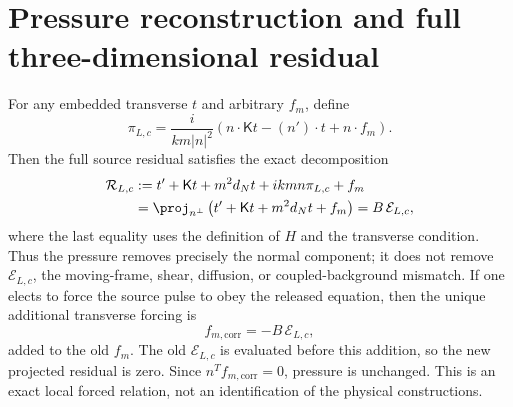 \section{Pressure reconstruction and full three-dimensional residual}
For any embedded transverse $t$ and arbitrary $f_m$, define
\begin{equation}
 \pi_{L,c}=\frac{i}{km|n|^2}
 \left(n\cdot\mathsf Kt-(n')\cdot t+n\cdot f_m\right).
 \label{nsbridge:eq:pressuremap}
\end{equation}
Then the full source residual satisfies the exact decomposition
\begin{align}
 \mathcal R_{L,c}
 &: =t'+\mathsf Kt+m^2d_Nt+ikm n\pi_{L,c}+f_m \\
 &=\proj_{n^\perp}\left(t'+\mathsf Kt+m^2d_Nt+f_m\right)
 =B\,\mathcal E_{L,c},
 \label{nsbridge:eq:fullresidual}
\end{align}
where the last equality uses the definition of $H$ and the transverse condition.
Thus the pressure removes precisely the normal component; it does not remove
$\mathcal E_{L,c}$, the moving-frame, shear, diffusion, or coupled-background
mismatch.  If one elects to force the source pulse to obey the released equation,
then the unique additional transverse forcing is
\begin{equation}
 f_{m,\mathrm{corr}}=-B\,\mathcal E_{L,c},
\end{equation}
added to the old $f_m$. The old $\mathcal E_{L,c}$ is evaluated before
this addition, so the new projected residual is zero.
Since $n^Tf_{m,\mathrm{corr}}=0$, pressure is unchanged.
This is an exact local
forced relation, not an identification of the physical constructions.

